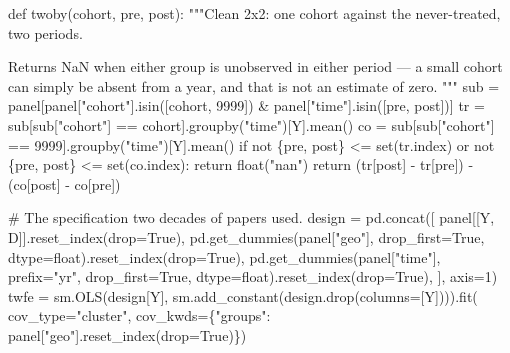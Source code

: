 \documentclass[
  letterpaper,
  10pt,
  twoside,
  openright,
  numbers=noenddot,
  chapterprefix=true]{scrbook}
\newenvironment{Shaded}{}{}
\newcommand{\BuiltInTok}[1]{\textcolor[rgb]{0.84,0.23,0.29}{#1}}
\newcommand{\CommentTok}[1]{\textcolor[rgb]{0.42,0.45,0.49}{#1}}
\newcommand{\ControlFlowTok}[1]{\textcolor[rgb]{0.84,0.23,0.29}{#1}}
\newcommand{\DecValTok}[1]{\textcolor[rgb]{0.00,0.36,0.77}{#1}}
\newcommand{\KeywordTok}[1]{\textcolor[rgb]{0.84,0.23,0.29}{#1}}
\newcommand{\NormalTok}[1]{\textcolor[rgb]{0.14,0.16,0.18}{#1}}
\newcommand{\OperatorTok}[1]{\textcolor[rgb]{0.14,0.16,0.18}{#1}}
\newcommand{\StringTok}[1]{\textcolor[rgb]{0.01,0.18,0.38}{#1}}
\newcommand{\VariableTok}[1]{\textcolor[rgb]{0.89,0.38,0.04}{#1}}
\begin{document}
\label{check-did}
\begin{Shaded}
\begin{Highlighting}[]
\KeywordTok{def}\NormalTok{ twoby(cohort, pre, post):}
    \CommentTok{"""Clean 2x2: one cohort against the never{-}treated, two periods.}

\CommentTok{    Returns NaN when either group is unobserved in either period — a small}
\CommentTok{    cohort can simply be absent from a year, and that is not an estimate of zero.}
\CommentTok{    """}
\NormalTok{    sub }\OperatorTok{=}\NormalTok{ panel[panel[}\StringTok{"cohort"}\NormalTok{].isin([cohort, }\DecValTok{9999}\NormalTok{]) }\OperatorTok{\&}\NormalTok{ panel[}\StringTok{"time"}\NormalTok{].isin([pre, post])]}
\NormalTok{    tr }\OperatorTok{=}\NormalTok{ sub[sub[}\StringTok{"cohort"}\NormalTok{] }\OperatorTok{==}\NormalTok{ cohort].groupby(}\StringTok{"time"}\NormalTok{)[Y].mean()}
\NormalTok{    co }\OperatorTok{=}\NormalTok{ sub[sub[}\StringTok{"cohort"}\NormalTok{] }\OperatorTok{==} \DecValTok{9999}\NormalTok{].groupby(}\StringTok{"time"}\NormalTok{)[Y].mean()}
    \ControlFlowTok{if} \KeywordTok{not}\NormalTok{ \{pre, post\} }\OperatorTok{\textless{}=} \BuiltInTok{set}\NormalTok{(tr.index) }\KeywordTok{or} \KeywordTok{not}\NormalTok{ \{pre, post\} }\OperatorTok{\textless{}=} \BuiltInTok{set}\NormalTok{(co.index):}
        \ControlFlowTok{return} \BuiltInTok{float}\NormalTok{(}\StringTok{"nan"}\NormalTok{)}
    \ControlFlowTok{return}\NormalTok{ (tr[post] }\OperatorTok{{-}}\NormalTok{ tr[pre]) }\OperatorTok{{-}}\NormalTok{ (co[post] }\OperatorTok{{-}}\NormalTok{ co[pre])}

\CommentTok{\# The specification two decades of papers used.}
\NormalTok{design }\OperatorTok{=}\NormalTok{ pd.concat([}
\NormalTok{    panel[[Y, D]].reset\_index(drop}\OperatorTok{=}\VariableTok{True}\NormalTok{),}
\NormalTok{    pd.get\_dummies(panel[}\StringTok{"geo"}\NormalTok{], drop\_first}\OperatorTok{=}\VariableTok{True}\NormalTok{, dtype}\OperatorTok{=}\BuiltInTok{float}\NormalTok{).reset\_index(drop}\OperatorTok{=}\VariableTok{True}\NormalTok{),}
\NormalTok{    pd.get\_dummies(panel[}\StringTok{"time"}\NormalTok{], prefix}\OperatorTok{=}\StringTok{"yr"}\NormalTok{, drop\_first}\OperatorTok{=}\VariableTok{True}\NormalTok{, dtype}\OperatorTok{=}\BuiltInTok{float}\NormalTok{).reset\_index(drop}\OperatorTok{=}\VariableTok{True}\NormalTok{),}
\NormalTok{], axis}\OperatorTok{=}\DecValTok{1}\NormalTok{)}
\NormalTok{twfe }\OperatorTok{=}\NormalTok{ sm.OLS(design[Y], sm.add\_constant(design.drop(columns}\OperatorTok{=}\NormalTok{[Y]))).fit(}
\NormalTok{    cov\_type}\OperatorTok{=}\StringTok{"cluster"}\NormalTok{, cov\_kwds}\OperatorTok{=}\NormalTok{\{}\StringTok{"groups"}\NormalTok{: panel[}\StringTok{"geo"}\NormalTok{].reset\_index(drop}\OperatorTok{=}\VariableTok{True}\NormalTok{)\})}


\end{Highlighting}
\end{Shaded}
\end{document}
